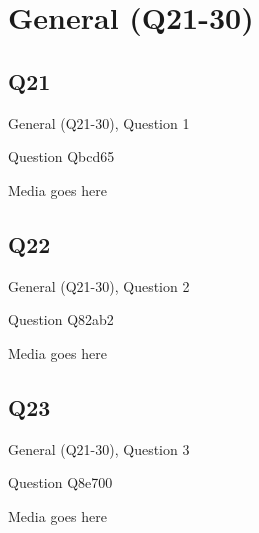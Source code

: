 \documentclass[11pt]{beamer}
\begin{document}
\section{General (Q21-30)}
    

\subsection*{Q21}
\begin{frame}[t]{General (Q21-30), Question 1}
\vspace{2em}
\begin{block}{Question}
Qbcd65
\end{block}
\begin{center}
Media goes here
\end{center}
\end{frame}
    

\subsection*{Q22}
\begin{frame}[t]{General (Q21-30), Question 2}
\vspace{2em}
\begin{block}{Question}
Q82ab2
\end{block}
\begin{center}
Media goes here
\end{center}
\end{frame}
    

\subsection*{Q23}
\begin{frame}[t]{General (Q21-30), Question 3}
\vspace{2em}
\begin{block}{Question}
Q8e700
\end{block}
\begin{center}
Media goes here
\end{center}
\end{frame}
    
\end{document}
